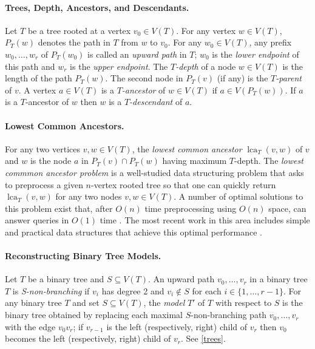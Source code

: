 \documentclass{patmorin}
\DeclareMathOperator{\lca}{lca}
\begin{document}
\paragraph*{Trees, Depth, Ancestors, and Descendants.}

Let $T$ be a tree rooted at a vertex $v_0\in V(T)$.  For any vertex $w\in V(T)$, $P_T(w)$ denotes the path in $T$ from $w$ to $v_0$.  For any $w_0\in V(T)$, any prefix $w_0,\ldots,w_r$ of $P_T(w_0)$ is called an \emph{upward path} in $T$; $w_0$ is the \emph{lower endpoint} of this path and $w_r$ is the \emph{upper endpoint}.  The \emph{$T$-depth} of a node $w\in V(T)$ is the length of the path $P_T(w)$. The second node in $P_T(v)$ (if any) is the \emph{$T$-parent} of $v$.  A vertex $a\in V(T)$ is a \emph{$T$-ancestor} of $w\in V(T)$ if $a\in V(P_T(w))$. If $a$ is a $T$-ancestor of $w$ then $w$ is a \emph{$T$-descendant} of $a$.



\paragraph*{Lowest Common Ancestors.}

For any two vertices $v,w\in V(T)$, the \emph{lowest common ancestor} $\lca_T(v,w)$ of $v$ and $w$ is the node $a$ in $P_T(v)\cap P_T(w)$ having maximum $T$-depth.  The \emph{lowest commmon ancestor problem} is a well-studied data structuring problem that asks to preprocess a given $n$-vertex rooted tree so that one can quickly return $\lca_T(v,w)$ for any two nodes $v,w\in V(T)$. A number of optimal solutions to this problem exist that, after $O(n)$ time preprocessing using $O(n)$ space, can answer queries in $O(1)$ time \cite{berman.vishkin:recursive,shieber.vishkin:on,harel.tarjan:fast,alstrup.gavoille.ea:nearest,bender.farach-colton:lca,fischer.heun:theoretical}.  The most recent work in this area includes simple and practical data structures that achieve this optimal performance \cite{alstrup.gavoille.ea:nearest,bender.farach-colton:lca,fischer.heun:theoretical}.

\paragraph*{Reconstructing Binary Tree Models.}

Let $T$ be a binary tree and $S \subseteq V(T)$. An upward path $v_0,\ldots,v_r$ in a binary tree $T$ is \emph{S-non-branching} if $v_{i}$ has degree 2 and $v_i \notin S$ for each $i\in\{1,\ldots,r-1\}$. For any binary tree $T$ and set $S \subseteq V(T)$, the \emph{model} $T'$ of $T$ with respect to $S$ is the binary tree obtained by replacing each maximal $S$-non-branching path $v_0,\ldots,v_r$ with the edge $v_0v_r$; if $v_{r-1}$ is the left (respectively, right) child of $v_r$ then $v_0$ becomes the left (respectively, right) child of $v_r$. See \cref{trees}.
\end{document}
